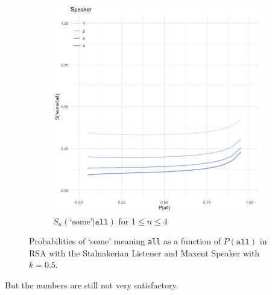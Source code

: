 \documentclass[12pt, a4paper, usenames, dvipsnames]{article}
\begin{document}
\begin{figure}[!htb]
\begin{subfigure}{.48\linewidth}
    \includegraphics[width=\textwidth]{graphs/shannonRSA-S05.png}
    \caption{\(S_n(\text{`some'}|\texttt{all})\) for \(1\leq n\leq 4\)}
  \end{subfigure}
  \caption{Probabilities of `some' meaning \texttt{all} as a function of \(P(\texttt{all})\) in RSA with the Stalnakerian Listener and Maxent Speaker with $k=0.5$.}
  \label{fig:shannon05}
\end{figure}
But the numbers are still not very satisfactory.
\end{document}
